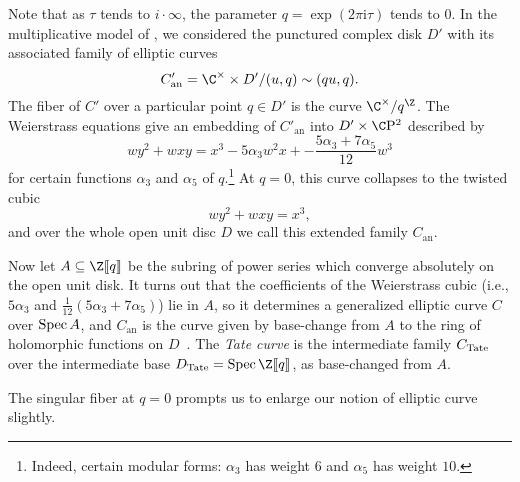 \begin{definition}
Note that as $\tau$ tends to $i \cdot \infty$, the parameter $q = \exp(2 \pi \mathrm i \tau)$ tends to $0$.  In the multiplicative model of , we considered the punctured complex disk $D'$ with its associated family of elliptic curves \[C'_{\mathrm{an}} = \C^\times \times D' / (u, q) \sim (qu, q).\]  The fiber of $C'$ over a particular point $q \in D'$ is the curve $\C^\times / q^{\Z}$. %
The Weierstrass equations give an embedding of $C'_{\mathrm{an}}$ into $D' \times \CP^2$ described by \[wy^2 + wxy = x^3 - 5 \alpha_3 w^2 x + -\frac{5 \alpha_3 + 7 \alpha_5}{12}w^3\] for certain functions $\alpha_3$ and $\alpha_5$ of $q$.\footnote{Indeed, certain modular forms: $\alpha_3$ has weight $6$ and $\alpha_5$ has weight $10$.}  At $q = 0$, this curve collapses to the twisted cubic \[wy^2 + wxy = x^3,\] and over the whole open unit disc $D$ we call this extended family $C_{\mathrm{an}}$.

Now let $A \subseteq \Z\ps{q}$ be the subring of power series which converge absolutely on the open unit disk.  It turns out that the coefficients of the Weierstrass cubic (i.e., $5\alpha_3$ and $\frac{1}{12}(5\alpha_3+7\alpha_5)$) lie in $A$, so it determines a generalized elliptic curve $C$ over $\operatorname{Spec} A$, and $C_{\mathrm{an}}$ is the curve given by base-change from $A$ to the ring of holomorphic functions on $D$~\cite[Section 5]{MoravaFormsOfKthy}.  The \textit{Tate curve} is the intermediate family $C_{\mathrm{Tate}}$ over the intermediate base $D_{\Tate} = \Spec \Z\ps{q}$, as base-changed from $A$.
\end{definition}

The singular fiber at $q = 0$ prompts us to enlarge our notion of elliptic curve slightly.

